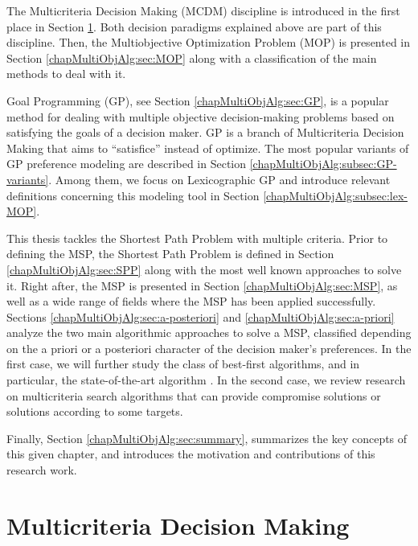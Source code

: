 The Multicriteria Decision Making (MCDM) discipline is introduced in the first place in Section \ref{chapMultiObjAlg:sec:MCDM}. Both decision paradigms explained above are part of this discipline. Then, the Multiobjective Optimization Problem (MOP) is presented in Section \ref{chapMultiObjAlg:sec:MOP} along with a classification of the main methods to deal with it. 

Goal Programming (GP), see Section \ref{chapMultiObjAlg:sec:GP}, is a popular method for dealing with multiple objective decision-making problems based on satisfying the goals of a decision maker. GP is a branch of Multicriteria Decision Making that aims to ``satisfice'' instead of optimize. The most popular variants of GP preference modeling are described in Section \ref{chapMultiObjAlg:subsec:GP-variants}. Among them, we focus on Lexicographic GP and introduce relevant definitions concerning this modeling tool in Section \ref{chapMultiObjAlg:subsec:lex-MOP}.

This thesis tackles the Shortest Path Problem with multiple criteria. Prior to defining the MSP, the Shortest Path Problem is defined in Section \ref{chapMultiObjAlg:sec:SPP} along with the most well known approaches to solve it. Right after, the MSP is presented in Section \ref{chapMultiObjAlg:sec:MSP}, as well as a wide range of fields where the MSP has been applied successfully. Sections \ref{chapMultiObjAlg:sec:a-posteriori} and \ref{chapMultiObjAlg:sec:a-priori} analyze the two main algorithmic approaches to solve a MSP, classified depending on the a priori or a posteriori character of the decision maker's preferences. In the first case, we will further study the class of best-first algorithms, and in particular, the state-of-the-art algorithm \namoa. In the second case, we review research on multicriteria search algorithms that can provide compromise solutions or solutions according to some targets.

Finally, Section \ref{chapMultiObjAlg:sec:summary}, summarizes the key concepts of this given chapter, and introduces the motivation and contributions of this research work.

\section{Multicriteria Decision Making}
\label{chapMultiObjAlg:sec:MCDM}

